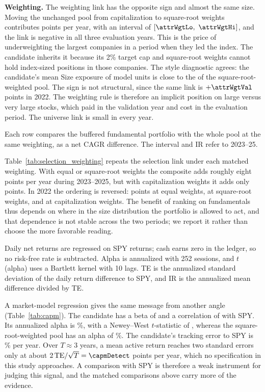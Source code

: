 \documentclass[11pt]{article}
\newcommand{\resulttable}[3]{\begin{table}[H]\centering\caption{#2}\label{tab:#1}\small\par\vspace{3pt}\begin{minipage}{\textwidth}\footnotesize #3\end{minipage}\end{table}}
\begin{document}
\textbf{Weighting.} The weighting link has the opposite sign and almost the same size. Moving the unchanged pool from capitalization to square-root weights contributes \attrWgt{} points per year, with an interval of $[\attrWgtLo,\ \attrWgtHi]$, and the link is negative in all three evaluation years. This is the price of underweighting the largest companies in a period when they led the index. The candidate inherits it because its 2\% target cap and square-root weights cannot hold index-sized positions in those companies. The style diagnostic agrees: the candidate's mean Size exposure of \styleSizeCand{} model units is close to the \styleSizePool{} of the square-root-weighted pool. The sign is not structural, since the same link is $+\attrWgtVal$ points in 2022. The weighting rule is therefore an implicit position on large versus very large stocks, which paid in the validation year and cost in the evaluation period. The universe link is small in every year.

\resulttable{selection_weighting}{The selection link under each matched weighting.}{Each row compares the buffered fundamental portfolio with the whole pool at the same weighting, as a net CAGR difference. The interval and IR refer to 2023--25.}
Table~\ref{tab:selection_weighting} repeats the selection link under each matched weighting. With equal or square-root weights the composite adds roughly eight points per year during 2023--2025, but with capitalization weights it adds only \selCap{} points. In 2022 the ordering is reversed: \selEqualVal{} points at equal weights, \attrSelVal{} at square-root weights, and \selCapVal{} at capitalization weights. The benefit of ranking on fundamentals thus depends on where in the size distribution the portfolio is allowed to act, and that dependence is not stable across the two periods; we report it rather than choose the more favorable reading.

\resulttable{capm}{Market-model diagnostics against SPY, 2023--2025.}{Daily net returns are regressed on SPY returns; cash earns zero in the ledger, so no risk-free rate is subtracted. Alpha is annualized with 252 sessions, and $t$(alpha) uses a Bartlett kernel with 10 lags. TE is the annualized standard deviation of the daily return difference to SPY, and IR is the annualized mean difference divided by TE.}
A market-model regression gives the same message from another angle (Table~\ref{tab:capm}). The candidate has a beta of \capmBeta{} and a correlation of \capmCorr{} with SPY. Its annualized alpha is \capmAlpha\%, with a Newey--West $t$-statistic of \capmT{}, whereas the square-root-weighted pool has an alpha of \capmPoolAlpha\%. The candidate's tracking error to SPY is \capmTE\% per year. Over $T\approx 3$ years, a mean active return reaches two standard errors only at about $2\,\mathrm{TE}/\sqrt{T}=\capmDetect$ points per year, which no specification in this study approaches. A comparison with SPY is therefore a weak instrument for judging this signal, and the matched comparisons above carry more of the evidence.
\end{document}
